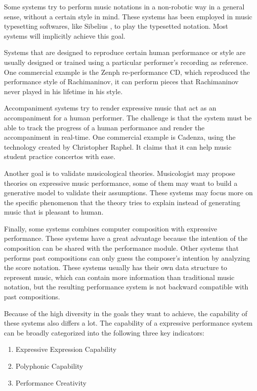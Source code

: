 Some systems try to perform music notations in a non-robotic way in a general sense, without a certain style in mind. These systems has been employed in music typesetting softwares, like Sibelius \cite{sibelius}, to play the typesetted notation. Most systems will implicitly achieve this goal.

Systems that are designed to reproduce certain human performance or style are usually designed or trained using a particular performer's recording as reference. One commercial example is the Zenph re-performance CD\cite{zenph}, which reproduced the performance style of Rachimaninov, it can perform pieces that Rachimaninov never played in his lifetime in his style. 


Accompaniment systems try to render expressive music that act as an accompaniment for a human performer. The challenge is that the system must be able to track the progress of a human performance and render the accompaniment in real-time. One commercial example is Cadenza\cite{cadenza}, using the technology created by Christopher Raphel\cite{chris}. It claims that it can help music student practice concertos with ease.

Another goal is to validate musicological theories. Musicologist may propose theories on expressive music performance, some of them may want to build a generative model to validate their assumptions. These systems may focus more on the specific phenomenon that the theory tries to explain instead of generating music that is pleasant to human. 

Finally, some systems combines computer composition with expressive performance. These systems have a great advantage because the intention of the composition can be shared with the performance module. Other systems that performs past compositions can only guess the composer's intention by analyzing the score notation. These systems usually has their own data structure to represent music, which can contain more information than traditional music notation, but the resulting performance system is not backward compatible with past compositions.

Because of the high diversity in the goals they want to achieve, the capability of these systems also differs a lot. The capability of a expressive performance system can be broadly categorized into the following three key indicators\cite{THEBOOK}:
\begin{enumerate}
   \item Expressive Expression Capability
   \item Polyphonic Capability
   \item Performance Creativity
\end{enumerate}

